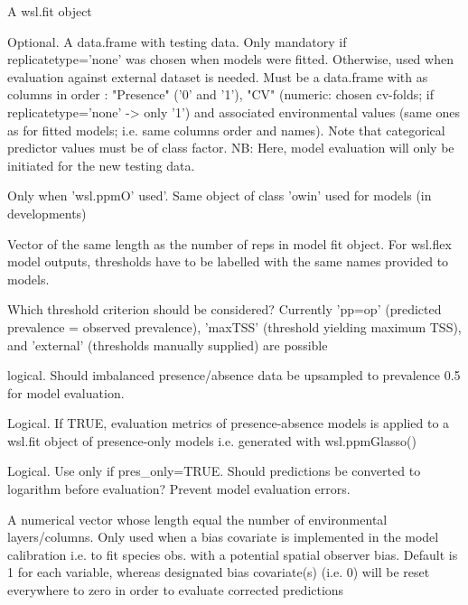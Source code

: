 \documentclass[a4paper]{book}
\begin{document}
\begin{Arguments}
\begin{ldescription}
\item[\code{x}] A wsl.fit object

\item[\code{tester}] Optional. A data.frame with testing data. Only mandatory if replicatetype='none'
was chosen when models were fitted. Otherwise, used when evaluation against external dataset is needed.
Must be a data.frame with as columns in order : "Presence" ('0' and '1'), "CV" (numeric: chosen
cv-folds; if replicatetype='none' -> only '1') and associated environmental values (same ones as
for fitted models; i.e. same columns order and names). Note that categorical predictor values must
be of class factor. NB: Here, model evaluation will only be initiated for the new testing data.

\item[\code{window}] Only when 'wsl.ppmO' used'. Same object of class 'owin' used for models (in developments)

\item[\code{thres}] Vector of the same length as the number of reps in model fit object. For wsl.flex
model outputs, thresholds have to be labelled with the same names provided to models.

\item[\code{crit}] Which threshold criterion should be considered? Currently 'pp=op'
(predicted prevalence = observed prevalence), 'maxTSS' (threshold yielding maximum TSS),
and 'external' (thresholds manually supplied) are possible

\item[\code{prevalence\_correction}] logical. Should imbalanced presence/absence data be upsampled to
prevalence 0.5 for model evaluation.

\item[\code{pres\_only}] Logical. If TRUE, evaluation metrics of presence-absence models is applied
to a wsl.fit object of presence-only models i.e. generated with wsl.ppmGlasso()

\item[\code{log\_trans}] Logical. Use only if pres\_only=TRUE. Should predictions be converted to logarithm
before evaluation? Prevent model evaluation errors.

\item[\code{bias\_cov}] A numerical vector whose length equal the number of environmental layers/columns.
Only used when a bias covariate is implemented in the model calibration i.e. to fit species obs. with
a potential spatial observer bias. Default is 1 for each variable, whereas designated bias covariate(s)
(i.e. 0) will be reset everywhere to zero in order to evaluate corrected predictions
\end{ldescription}
\end{Arguments}
\end{document}
